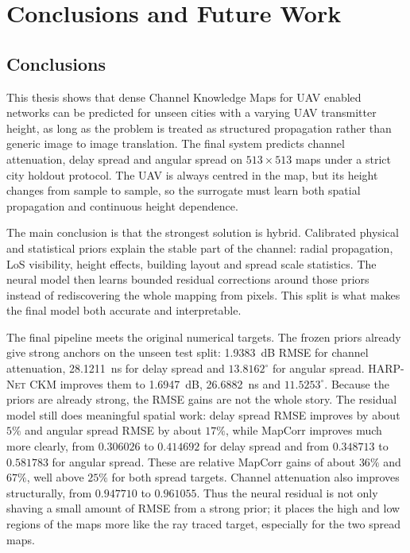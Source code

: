 \chapter{Conclusions and Future Work}

\section{Conclusions}

This thesis shows that dense Channel Knowledge Maps for UAV enabled networks
can be predicted for unseen cities with a varying UAV transmitter height, as
long as the problem is treated as structured propagation rather than generic
image to image translation. The final system predicts channel attenuation,
delay spread and angular spread on \(513\times513\) maps under a strict city
holdout protocol. The UAV is always centred in the map, but its height changes
from sample to sample, so the surrogate must learn both spatial propagation and
continuous height dependence.

The main conclusion is that the strongest solution is hybrid. Calibrated
physical and statistical priors explain the stable part of the channel:
radial propagation, LoS visibility, height effects, building layout and spread
scale statistics. The neural model then learns bounded residual corrections
around those priors instead of rediscovering the whole mapping from pixels.
This split is what makes the final model both accurate and interpretable.

The final pipeline meets the original numerical targets. The frozen priors
already give strong anchors on the unseen test split: \SI{1.9383}{dB} RMSE for
channel attenuation, \SI{28.1211}{ns} for delay spread and \(13.8162^\circ\)
for angular spread. \textsc{HARP-Net CKM} improves them to
\SI{1.6947}{dB}, \SI{26.6882}{ns} and \(11.5253^\circ\). Because the priors
are already strong, the RMSE gains are not the whole story. The residual model
still does meaningful spatial work: delay spread RMSE improves by about \(5\%\)
and angular spread RMSE by about \(17\%\), while MapCorr improves much more
clearly, from \(0.306026\) to \(0.414692\) for delay spread and from
\(0.348713\) to \(0.581783\) for angular spread. These are relative MapCorr
gains of about \(36\%\) and \(67\%\), well above \(25\%\) for both spread
targets. Channel attenuation also improves structurally, from \(0.947710\) to
\(0.961055\). Thus the neural residual is not only shaving a small amount of
RMSE from a strong prior; it places the high and low regions of the maps more
like the ray traced target, especially for the two spread maps.

